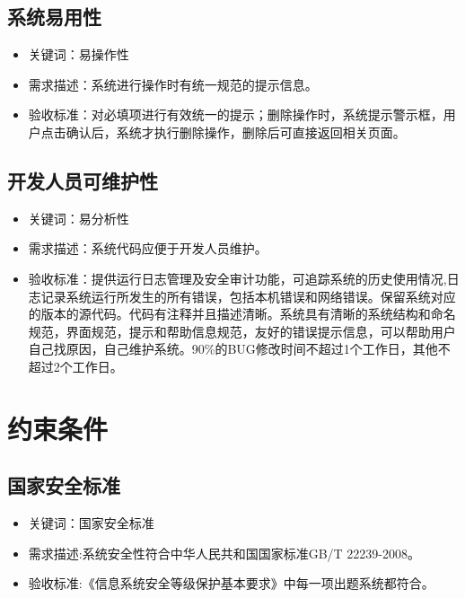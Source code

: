 \documentclass[hyperref, a4paper]{ctexart}
\providecommand{\tightlist}{%
  \setlength{\itemsep}{0pt}\setlength{\parskip}{0pt}}
\begin{document}
\hypertarget{ux7cfbux7edfux6613ux7528ux6027}{%
\subsection{系统易用性}\label{ux7cfbux7edfux6613ux7528ux6027}}

\begin{itemize}
\tightlist
\item
  关键词：易操作性
\item
  需求描述：系统进行操作时有统一规范的提示信息。
\item
  验收标准：对必填项进行有效统一的提示；删除操作时，系统提示警示框，用户点击确认后，系统才执行删除操作，删除后可直接返回相关页面。
\end{itemize}

\hypertarget{ux5f00ux53d1ux4ebaux5458ux53efux7ef4ux62a4ux6027}{%
\subsection{开发人员可维护性}\label{ux5f00ux53d1ux4ebaux5458ux53efux7ef4ux62a4ux6027}}

\begin{itemize}
\tightlist
\item
  关键词：易分析性
\item
  需求描述：系统代码应便于开发人员维护。
\item
  验收标准：提供运行日志管理及安全审计功能，可追踪系统的历史使用情况,日志记录系统运行所发生的所有错误，包括本机错误和网络错误。保留系统对应的版本的源代码。代码有注释并且描述清晰。系统具有清晰的系统结构和命名规范，界面规范，提示和帮助信息规范，友好的错误提示信息，可以帮助用户自己找原因，自己维护系统。90\%的BUG修改时间不超过1个工作日，其他不超过2个工作日。
\end{itemize}

\hypertarget{ux7ea6ux675fux6761ux4ef6}{%
\section{约束条件}\label{ux7ea6ux675fux6761ux4ef6}}

\hypertarget{ux56fdux5bb6ux5b89ux5168ux6807ux51c6}{%
\subsection{国家安全标准}\label{ux56fdux5bb6ux5b89ux5168ux6807ux51c6}}

\begin{itemize}
\tightlist
\item
  关键词：国家安全标准
\item
  需求描述:系统安全性符合中华人民共和国国家标准GB/T 22239-2008。
\item
  验收标准:《信息系统安全等级保护基本要求》中每一项出题系统都符合。
\end{itemize}
\end{document}
